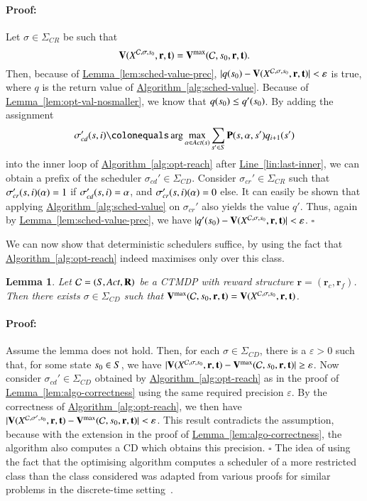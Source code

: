 \documentclass[10pt,twocolumn]{article}
\newenvironment{proof}{\paragraph{Proof:}}{\hfill$\square$}
\newtheorem{lemma}{Lemma}
\renewcommand{\gets}{\colonequals}
\newcommand{\states} {{\ensuremath S}}
\newcommand{\state}  {{\ensuremath s}}
\newcommand{\sched}  {{\ensuremath {\sigma}}}
\newcommand{\acts}{\mathit{Act}}
\newcommand{\pmat}{\mathbf{P}}
\newcommand{\rmat}{\mathbf{R}}
\newcommand{\cmodel}{\mathcal{C}}
\newcommand{\act}{\alpha}
\newcommand{\schedscr}{\Sigma_\mathit{CR}}
\newcommand{\schedscd}{\Sigma_\mathit{CD}}
\newcommand{\rew}{\mathbf{r}}
\newcommand{\frew}{\mathbf{r}_f}
\newcommand{\crew}{\mathbf{r}_c}
\newcommand{\timeb}{\mathbf{t}}
\newcommand{\mvalue}{\mathbf{V}}
\newcommand{\precision}{\varepsilon}
\newcommand{\stopro}{X}
\newcommand{\reflem}[1]{\texorpdfstring{\hyperref[lem:#1]{Lemma~\ref*{lem:#1}}}{Lemma~\ref*{lem:#1}}}
\newcommand{\refalg}[1]{\texorpdfstring{\hyperref[alg:#1]{Algorithm~\ref*{alg:#1}}}{Algorithm~\ref*{alg:#1}}}
\newcommand{\reflin}[1]{\texorpdfstring{\hyperref[lin:#1]{Line~\ref*{lin:#1}}}{Line~\ref*{lin:#1}}}
\begin{document}
\begin{proof}
  Let $\sched \in \schedscr$ be such that
\begin{equation}\label{eqn:opt-schedscr}
    \mvalue(\stopro^{\cmodel,\sched,\state_0}, \rew, \timeb) = \mvalue^{\max}(\cmodel, \state_0, \rew, \timeb).
  \end{equation}
Then, because of \reflem{sched-value-prec}, $|q(\state_0) - \mvalue(\stopro^{\cmodel,\sched,\state_0}, \rew, \timeb) | < \precision$ is true,
  where $q$ is the return value of \refalg{sched-value}.
  Because of \reflem{opt-val-nosmaller}, we know that $q(\state_0) \leq q'(\state_0)$.
  By adding the assignment
\begin{equation*}
    \sigma_\mathit{cd}'(\state, i) \gets \arg\max_{\act\in\acts(s)} \sum_{\state' \in S} \pmat(s,\act,s') q_{i+1}(s')
  \end{equation*}
into the inner loop of \refalg{opt-reach} after \reflin{last-inner}, we can obtain a prefix of the scheduler $\sigma_\mathit{cd}' \in \schedscd$.
  Consider $\sigma_\mathit{cr}' \in \schedscr$ such that $\sigma_\mathit{cr}'(\state, i)(\act) = 1$ if $\sigma_\mathit{cd}'(\state, i) = \act$,
  and $\sigma_\mathit{cr}'(\state, i)(\act) = 0$ else.
  It can easily be shown that applying \refalg{sched-value} on $\sigma_\mathit{cr}'$ also yields the value $q'$.
  Thus, again by \reflem{sched-value-prec}, we have $|q'(\state_0) - \mvalue(\stopro^{\cmodel,\sched,\state_0}, \rew, \timeb) | < \precision$.
\end{proof}

We can now show that deterministic schedulers suffice, by using the fact that \refalg{opt-reach} indeed maximises only over this class.
\begin{lemma}
  Let $\cmodel = (\states, \acts, \rmat)$ be a CTMDP with reward structure $\rew = (\crew, \frew)$.
  Then there exists $\sched \in \schedscd$ such that $\mvalue^{\max}(\cmodel, \state_0, \rew, \timeb) = \mvalue(\stopro^{\cmodel,\sched,\state_0},\rew, \timeb)$.
\end{lemma}

\begin{proof}
  Assume the lemma does not hold.
  Then, for each $\sched \in \schedscd$, there is a $\precision > 0$ such that, for some state $\state_0 \in \states$,
  we have $|\mvalue(\stopro^{\cmodel,\sched,\state_0}, \rew, \timeb) - \mvalue^{\max}(\cmodel, \state_0, \rew, \timeb)| \geq \precision$.
  Now consider $\sched_\mathit{cd}' \in \schedscd$ obtained by \refalg{opt-reach} as in the proof of \reflem{algo-correctness} using the same required precision $\precision$.
  By the correctness of \refalg{opt-reach}, we then have $|\mvalue(\stopro^{\cmodel,\sched',\state_0}, \rew, \timeb) - \mvalue^{\max}(\cmodel, \state_0, \rew, \timeb)| < \precision$.
  This result contradicts the assumption, because with the extension in the proof of \reflem{algo-correctness},
  the algorithm also computes a CD which obtains this precision.
\end{proof}
The idea of using the fact that the optimising algorithm computes a scheduler of a more restricted class than the class considered was adapted from various proofs for similar problems in the discrete-time setting~\cite{Puterman94}.
\end{document}
